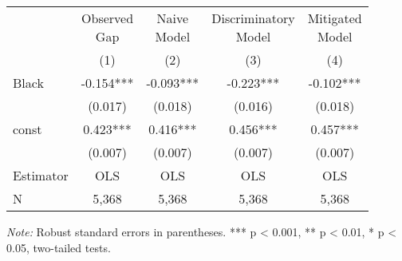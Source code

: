 \begin{tabular}{lcccc}
\toprule
 &  \makecell{Observed \\ Gap} & \makecell{Naive \\ Model} &    \makecell{Discriminatory \\ Model} &   \makecell{Mitigated \\ Model}  \\
\cline{2-5}
{} &        (1) &        (2) &        (3) &         (4) \\
\midrule
Black              &  -0.154*** &  -0.093*** &  -0.223*** &   -0.102*** \\
                   &    (0.017) &    (0.018) &    (0.016) &     (0.018) \\
const              &   0.423*** &   0.416*** &   0.456*** &    0.457*** \\
                   &    (0.007) &    (0.007) &    (0.007) &     (0.007) \\
\midrule
Estimator          &        OLS &        OLS &        OLS &         OLS \\
\midrule
N                  &      5,368 &      5,368 &      5,368 &       5,368 \\
\bottomrule
\end{tabular}

\begin{singlespace} \noindent  \textit{Note:} Robust standard errors in parentheses. *** p < 0.001, ** p < 0.01, * p < 0.05, two-tailed tests.\end{singlespace}
